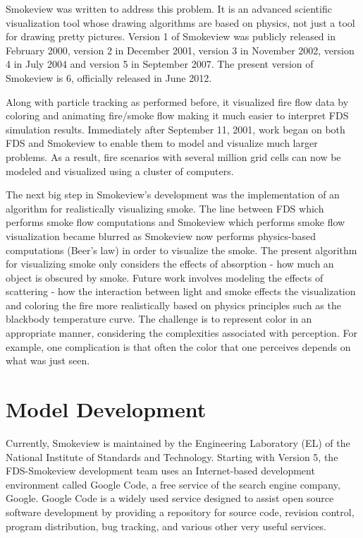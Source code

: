 \documentclass[11pt,twoside]{book}
\begin{document}
Smokeview was written to address this problem. It is an advanced
scientific visualization tool whose drawing algorithms are based
on physics, not just a tool for drawing pretty pictures. Version 1
of Smokeview was publicly released in February 2000, version 2 in
December 2001, version 3 in November 2002, version 4 in July
2004 and version 5 in September 2007.
The present version of Smokeview is 6, officially released
in June 2012.

Along with particle tracking as performed before, it visualized
fire flow data by coloring and animating fire/smoke flow making it
much easier to interpret FDS simulation results.  Immediately
after September 11, 2001, work began on both FDS and Smokeview to
enable them to model and visualize much larger problems.  As a
result, fire scenarios with several million grid cells can now be
modeled and visualized using a cluster of computers.

The next big step in Smokeview's development was the
implementation of an algorithm for realistically visualizing
smoke. The line between FDS which performs smoke flow computations
and Smokeview which performs smoke flow visualization became
blurred as Smokeview now performs physics-based computations
(Beer's law) in order to visualize the smoke.  The present
algorithm for visualizing smoke only considers the effects of
absorption - how much an object is obscured by smoke.  Future work
involves modeling the effects of scattering - how the interaction
between light and smoke effects the visualization and coloring the
fire more realistically based on physics principles such as the
blackbody temperature curve.  The challenge is to represent color
in an appropriate manner, considering the complexities associated
with perception.  For example, one complication is that often the
color that one perceives depends on what was just seen.

%
%

\section{Model Development}
Currently, Smokeview is maintained by the Engineering Laboratory
(EL) of the National Institute of Standards and Technology.
Starting with Version 5, the FDS-Smokeview development team uses
an Internet-based development environment called Google Code, a
free service of the search engine company, Google. Google Code is
a widely used service designed to assist open source software
development by providing a repository for source code, revision
control, program distribution, bug tracking, and various other
very useful services.
\end{document}
